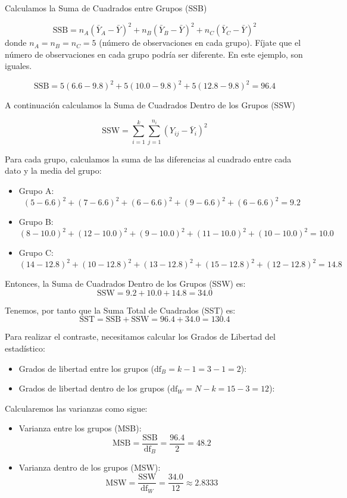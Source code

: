 \documentclass[
  letterpaper,
  DIV=11,
  numbers=noendperiod]{scrreprt}
\providecommand{\tightlist}{%
  \setlength{\itemsep}{0pt}\setlength{\parskip}{0pt}}\usepackage{longtable,booktabs,array}
\begin{document}
\begin{tcolorbox}
Calculamos la Suma de Cuadrados entre Grupos (SSB)

\[
\text{SSB} = n_A (\bar{Y}_A - \bar{Y})^2 + n_B (\bar{Y}_B - \bar{Y})^2 + n_C (\bar{Y}_C - \bar{Y})^2
\] donde \(n_A = n_B = n_C = 5\) (número de observaciones en cada
grupo). Fíjate que el número de observaciones en cada grupo podría ser
diferente. En este ejemplo, son iguales.

\[
\text{SSB} = 5 (6.6 - 9.8)^2 + 5 (10.0 - 9.8)^2 + 5 (12.8 - 9.8)^2 =96.4
\]

A continuación calculamos la Suma de Cuadrados Dentro de los Grupos
(SSW)

\[
\text{SSW} = \sum_{i=1}^{k} \sum_{j=1}^{n_i} (Y_{ij} - \bar{Y}_i)^2
\]

Para cada grupo, calculamos la suma de las diferencias al cuadrado entre
cada dato y la media del grupo:

\begin{itemize}
\item
  Grupo A: \[
  (5 - 6.6)^2 + (7 - 6.6)^2 + (6 - 6.6)^2 + (9 - 6.6)^2 + (6 - 6.6)^2 = 9.2
  \]
\item
  Grupo B: \[
  (8 - 10.0)^2 + (12 - 10.0)^2 + (9 - 10.0)^2 + (11 - 10.0)^2 + (10 - 10.0)^2 = 10.0
  \]
\item
  Grupo C: \[
  (14 - 12.8)^2 + (10 - 12.8)^2 + (13 - 12.8)^2 + (15 - 12.8)^2 + (12 - 12.8)^2 = 14.8
  \]
\end{itemize}

Entonces, la Suma de Cuadrados Dentro de los Grupos (SSW) es: \[
\text{SSW} = 9.2 + 10.0 + 14.8 = 34.0
\]

Tenemos, por tanto que la Suma Total de Cuadrados (SST) es: \[
\text{SST} = \text{SSB} + \text{SSW} = 96.4 + 34.0 = 130.4
\]

Para realizar el contraste, necesitamos calcular los Grados de Libertad
del estadístico:

\begin{itemize}
\tightlist
\item
  Grados de libertad entre los grupos (\(\text{df}_B = k-1=3-1=2\)):
\item
  Grados de libertad dentro de los grupos (\(\text{df}_W=N-k=15-3=12\)):
\end{itemize}

Calcularemos las varianzas como sigue:

\begin{itemize}
\item
  Varianza entre los grupos (MSB): \[
  \text{MSB} = \frac{\text{SSB}}{\text{df}_B} = \frac{96.4}{2} = 48.2
  \]
\item
  Varianza dentro de los grupos (MSW): \[
  \text{MSW} = \frac{\text{SSW}}{\text{df}_W} = \frac{34.0}{12} \approx 2.8333
  \]
\end{itemize}


\end{tcolorbox}
\end{document}
